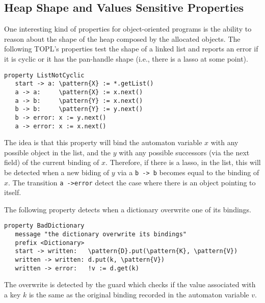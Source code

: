 \documentclass{sigplanconf}[10pt] %
\newcommand{\delimitVerbatim}{\par\nobreak\smallskip\noindent}
\newcommand{\pattern}[1]{\ensuremath{\mathtt{\underline{#1}}}}
\begin{document}
\subsection{Heap Shape and Values Sensitive Properties}  %
One interesting kind of properties for object-oriented programs is the ability to reason about the shape of the heap composed by the allocated objects.
The following TOPL's properties test the shape of a linked list and reports an error if it is cyclic or it has the pan-handle shape (i.e., there is a lasso at some point).
%
\delimitVerbatim
\begin{Verbatim}[commandchars=\\\{\}]
property ListNotCyclic
   start -> a: \pattern{X} := *.getList()
   a -> a:     \pattern{X} := x.next()
   a -> b:     \pattern{Y} := x.next()
   b -> b:     \pattern{Y} := y.next()
   b -> error: x := y.next()
   a -> error: x := x.next()
\end{Verbatim}
\delimitVerbatim
The idea is that this property will bind the automaton variable $x$ with any possible object in the list, and the $y$ with any possible successors (via the next field) of the current binding of $x$.
Therefore, if there is a lasso, in the list, this will be detected when a new biding of $y$ via a \texttt{b -> b} becomes equal to the binding of $x$.
The transition \texttt{a ->error} detect the case where there is an object pointing to itself.


The following property detects when a dictionary overwrite one of its bindings.
\delimitVerbatim
\begin{Verbatim}[commandchars=\\\{\}]
 property BadDictionary
   message "the dictionary overwrite its bindings"
   prefix <Dictionary>
   start -> written:   \pattern{D}.put(\pattern{K}, \pattern{V})
   written -> written: d.put(k, \pattern{V})
   written -> error:   !v := d.get(k)
\end{Verbatim}
\delimitVerbatim
The overwrite is detected by the guard which checks if the value associated with a key $k$ is the same as the original binding recorded in the automaton variable $v$.

\end{document}
